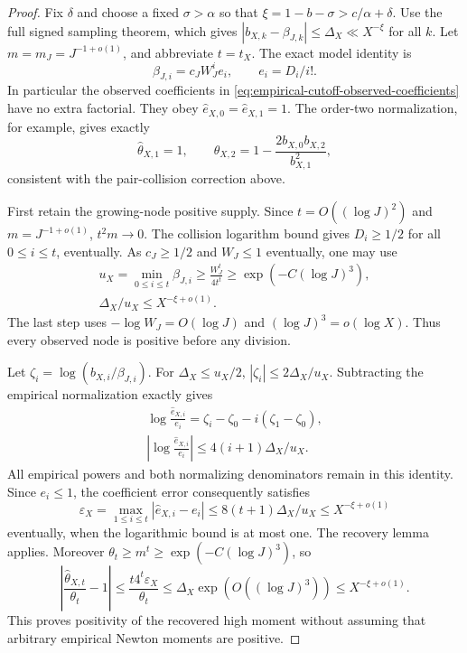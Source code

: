 \documentclass[11pt]{article}
\theoremstyle{definition}
\begin{document}
\begin{proof}
Fix $\delta$ and choose a fixed $\sigma>\alpha$ so that
$\xi=1-b-\sigma>c/\alpha+\delta$.
Use the full signed sampling theorem, which gives
$|b_{X,k}-\beta_{J,k}|\le\Delta_X\ll X^{-\xi}$ for all $k$.
Let $m=m_J=J^{-1+o(1)}$, and abbreviate $t=t_X$.
The exact model identity is
\[
 \beta_{J,i}=c_JW_J^ie_i,\qquad e_i=D_i/i! .
\]
In particular the observed coefficients in
\eqref{eq:empirical-cutoff-observed-coefficients}
have no extra factorial.  They obey
$\widehat e_{X,0}=\widehat e_{X,1}=1$.
The order-two normalization, for example, gives exactly
\[
 \widehat\theta_{X,1}=1,\qquad
 \widehat\theta_{X,2}
       =1-\frac{2b_{X,0}b_{X,2}}{b_{X,1}^2},
\]
consistent with the pair-collision correction above.

First retain the growing-node positive supply.
Since $t=O((\log J)^2)$ and $m=J^{-1+o(1)}$,
$t^2m\to0$.
The collision logarithm bound gives $D_i\ge1/2$ for all
$0\le i\le t$, eventually.
As $c_J\ge1/2$ and $W_J\le1$ eventually, one may use
\begin{equation}
 \begin{gathered}
 u_X=\min_{0\le i\le t}\beta_{J,i}
       \ge\frac{W_J^t}{4t^t}
       \ge\exp(-C(\log J)^3),\\
       \Delta_X/u_X\le X^{-\xi+o(1)} .
 \end{gathered}
 \label{eq:empirical-cutoff-node-supply}
\end{equation}
The last step uses $-\log W_J=O(\log J)$ and
$(\log J)^3=o(\log X)$.
Thus every observed node is positive before any division.

Let $\zeta_i=\log(b_{X,i}/\beta_{J,i})$.
For $\Delta_X\le u_X/2$, $|\zeta_i|\le2\Delta_X/u_X$.
Subtracting the empirical normalization exactly gives
\begin{equation}
 \begin{gathered}
 \log\frac{\widehat e_{X,i}}{e_i}
       =\zeta_i-\zeta_0-i(\zeta_1-\zeta_0),\\
 \left|\log\frac{\widehat e_{X,i}}{e_i}\right|
                 \le4(i+1)\Delta_X/u_X .
 \end{gathered}
 \label{eq:empirical-cutoff-normalization-error}
\end{equation}
All empirical powers and both normalizing denominators remain
in this identity.
Since $e_i\le1$, the coefficient error consequently satisfies
\[
 \varepsilon_X=\max_{1\le i\le t}
                        |\widehat e_{X,i}-e_i|
       \le8(t+1)\Delta_X/u_X
       \le X^{-\xi+o(1)}
\]
eventually, when the logarithmic bound is at most one.
The recovery lemma applies.
Moreover $\theta_t\ge m^t\ge\exp(-C(\log J)^3)$, so
\begin{equation}
 \left|\frac{\widehat\theta_{X,t}}{\theta_t}-1\right|
     \le\frac{t4^t\varepsilon_X}{\theta_t}
     \le\Delta_X\exp(O((\log J)^3))
     \le X^{-\xi+o(1)} .
 \label{eq:empirical-cutoff-relative-moment}
\end{equation}
This proves positivity of the recovered high moment without
assuming that arbitrary empirical Newton moments are positive.


\end{proof}
\end{document}
